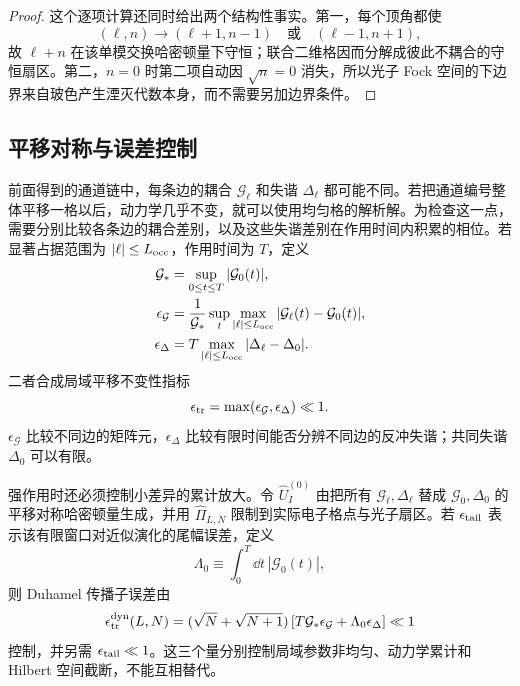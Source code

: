 \begin{proof}
这个逐项计算还同时给出两个结构性事实。第一，每个顶角都使
\[
 (\ell,n)\longrightarrow(\ell+1,n-1)
 \quad\text{或}\quad
 (\ell-1,n+1),
\]
故 $\ell+n$ 在该单模交换哈密顿量下守恒；联合二维格因而分解成彼此不耦合的守恒扇区。第二，$n=0$ 时第二项自动因 $\sqrt n=0$ 消失，所以光子 Fock 空间的下边界来自玻色产生湮灭代数本身，而不需要另加边界条件。
\end{proof}


\subsection{平移对称与误差控制}

前面得到的通道链中，每条边的耦合 $\mathcal G_\ell$ 和失谐 $\Delta_\ell$ 都可能不同。若把通道编号整体平移一格以后，动力学几乎不变，就可以使用均匀格的解析解。为检查这一点，需要分别比较各条边的耦合差别，以及这些失谐差别在作用时间内积累的相位。若显著占据范围为 $|\ell|\le L_{\rm occ}$，作用时间为 $T$，定义
\begin{align*}
\mathcal G_*&=\sup_{0\le t\le T}|\mathcal G_0(t)|,\\
\epsilon_{\mathcal G}
&=\frac1{\mathcal G_*}
\sup_t\max_{|\ell|\le L_{\rm occ}}|\mathcal G_\ell(t)-\mathcal G_0(t)|,\\
\epsilon_\Delta
&=T\max_{|\ell|\le L_{\rm occ}}|\Delta_\ell-\Delta_0|.
\end{align*}
二者合成局域平移不变性指标
\begin{equation}
{
\epsilon_{\rm tr}=\max(\epsilon_{\mathcal G},\epsilon_\Delta)\ll1.}
\label{eq:master_translation_invariance_conditions}
\end{equation}
$\epsilon_{\mathcal G}$ 比较不同边的矩阵元，$\epsilon_\Delta$ 比较有限时间能否分辨不同边的反冲失谐；共同失谐 $\Delta_0$ 可以有限。

强作用时还必须控制小差异的累计放大。令 $\hat U_I^{(0)}$ 由把所有 $\mathcal G_\ell,\Delta_\ell$ 替成 $\mathcal G_0,\Delta_0$ 的平移对称哈密顿量生成，并用 $\hat\Pi_{L,N}$ 限制到实际电子格点与光子扇区。若 $\epsilon_{\rm tail}$ 表示该有限窗口对近似演化的尾幅误差，定义
\begin{equation*}
\Lambda_0\equiv\int_0^T\dd t\,|\mathcal G_0(t)|,
\end{equation*}
则 Duhamel 传播子误差由
\begin{equation}
{
\epsilon_{\rm tr}^{\rm dyn}(L,N)
=(\sqrt N+\sqrt{N+1})
\left[T\mathcal G_*\epsilon_{\mathcal G}+\Lambda_0\epsilon_\Delta\right]\ll1}
\label{eq:translation_invariance_duhamel_error}
\end{equation}
控制，并另需 $\epsilon_{\rm tail}\ll1$。这三个量分别控制局域参数非均匀、动力学累计和 Hilbert 空间截断，不能互相替代。

